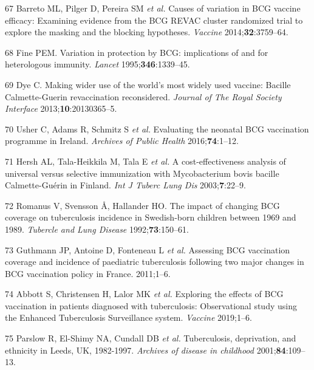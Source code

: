\documentclass[11pt,twoside]{bristolthesis}
\begin{document}
  \leavevmode\hypertarget{ref-Barreto2014a}{}%
  67 Barreto ML, Pilger D, Pereira SM \emph{et al.} Causes of variation in BCG vaccine efficacy: Examining evidence from the BCG REVAC cluster randomized trial to explore the masking and the blocking hypotheses. \emph{Vaccine} 2014;\textbf{32}:3759--64.
  
  \leavevmode\hypertarget{ref-Fine1995}{}%
  68 Fine PEM. Variation in protection by BCG: implications of and for heterologous immunity. \emph{Lancet} 1995;\textbf{346}:1339--45.
  
  \leavevmode\hypertarget{ref-Dye2013a}{}%
  69 Dye C. Making wider use of the world's most widely used vaccine: Bacille Calmette-Guerin revaccination reconsidered. \emph{Journal of The Royal Society Interface} 2013;\textbf{10}:20130365--5.
  
  \leavevmode\hypertarget{ref-Usher2016}{}%
  70 Usher C, Adams R, Schmitz S \emph{et al.} Evaluating the neonatal BCG vaccination programme in Ireland. \emph{Archives of Public Health} 2016;\textbf{74}:1--12.
  
  \leavevmode\hypertarget{ref-Hersh2003}{}%
  71 Hersh AL, Tala-Heikkila M, Tala E \emph{et al.} A cost-effectiveness analysis of universal versus selective immunization with Mycobacterium bovis bacille Calmette-Guérin in Finland. \emph{Int J Tuberc Lung Dis} 2003;\textbf{7}:22--9.
  
  \leavevmode\hypertarget{ref-Romanus1992}{}%
  72 Romanus V, Svensson Å, Hallander HO. The impact of changing BCG coverage on tuberculosis incidence in Swedish-born children between 1969 and 1989. \emph{Tubercle and Lung Disease} 1992;\textbf{73}:150--61.
  
  \leavevmode\hypertarget{ref-Guthmann2011}{}%
  73 Guthmann JP, Antoine D, Fonteneau L \emph{et al.} Assessing BCG vaccination coverage and incidence of paediatric tuberculosis following two major changes in BCG vaccination policy in France. 2011;1--6.
  
  \leavevmode\hypertarget{ref-Abbott:2019ir}{}%
  74 Abbott S, Christensen H, Lalor MK \emph{et al.} Exploring the effects of BCG vaccination in patients diagnosed with tuberculosis: Observational study using the Enhanced Tuberculosis Surveillance system. \emph{Vaccine} 2019;1--6.
  
  \leavevmode\hypertarget{ref-Parslow2001}{}%
  75 Parslow R, El-Shimy NA, Cundall DB \emph{et al.} Tuberculosis, deprivation, and ethnicity in Leeds, UK, 1982-1997. \emph{Archives of disease in childhood} 2001;\textbf{84}:109--13.
  
\end{document}
